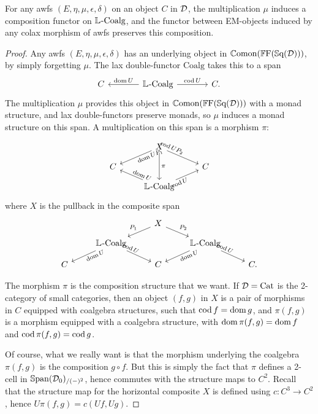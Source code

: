 \begin{corollary}\label{Cor:CoalgComp}
	For any awfs $(E,\eta,\mu,\epsilon,\delta)$ on an object $C$ in $\mathcal{D}$, the multiplication $\mu$ induces a composition functor on $\mathbb{L}_{}\text{-}\mathrm{Coalg}$, and the functor between EM-objects induced by any colax morphism of awfs preserves this composition.
\end{corollary}
\begin{proof}
	Any awfs $(E,\eta,\mu,\epsilon,\delta)$ has an underlying object in $\mathbb{C}\mathrm{omon}(\mathbb{F}\mathrm{F}(\mathbb{S}\mathrm{q}(\mathcal{D})))$, by simply forgetting $\mu$. The lax double-functor $\mathrm{Coalg}$ takes this to a span
	\[
	\begin{tikzcd}[column sep=large]
		C & \LCoalg \lar[swap]{\dom U} \rar{\cod U} & C.
	\end{tikzcd}
	\]
	The multiplication $\mu$ provides this object in $\mathbb{C}\mathrm{omon}(\mathbb{F}\mathrm{F}(\mathbb{S}\mathrm{q}(\mathcal{D})))$ with a monad structure, and lax double-functors preserve monads, so $\mu$ induces a monad structure on this span. A multiplication on this span is a morphism $\pi$:
	\[
	\begin{tikzcd}[row sep=small,sloped,pos=.1]
		{} & X \dlar[swap]{\dom UP_1} \drar{\cod UP_2} \ar{dd}[sloped=false,pos=.5]{\pi} & \\
		C && C \\
		& \LCoalg \ular{\dom U} \urar[swap]{\cod U}
	\end{tikzcd}
	\]
	where $X$ is the pullback in the composite span
	\[
	\begin{tikzcd}[row sep=small]
		{} && X \dlar[swap]{P_1} \drar{P_2} && \\
		& \LCoalg \dlar[swap,sloped,pos=.1]{\dom U} \drar[sloped,pos=.1]{\cod U}
			&& \LCoalg \dlar[swap,sloped,pos=.1]{\dom U} \drar[sloped,pos=.1]{\cod U} & \\
		C && C && C.
	\end{tikzcd}
	\]

	The morphism $\pi$ is the composition structure that we want. If $\mathcal{D}=\mathrm{Cat}$ is the 2-category of small categories, then an object $(f,g)$ in $X$ is a pair of morphisms in $C$ equipped with coalgebra structures, such that $\operatorname{cod} f = \operatorname{dom} g$, and $\pi(f,g)$ is a morphism equipped with a coalgebra structure, with $\operatorname{dom} \pi(f,g)=\operatorname{dom} f$ and $\operatorname{cod} \pi(f,g)=\operatorname{cod} g$.

	Of course, what we really want is that the morphism underlying the coalgebra $\pi(f,g)$ is the composition $g\circ f$. But this is simply the fact that $\pi$ defines a 2-cell in $\mathbb{S}\mathrm{pan}(\mathcal{D}_0)_{/(-)^2}$, hence commutes with the structure maps to $C^2$. Recall that the structure map for the horizontal composite $X$ is defined using $c\colon C^3\to C^2$, hence $U\pi(f,g)=c(Uf,Ug)$.
\end{proof}

